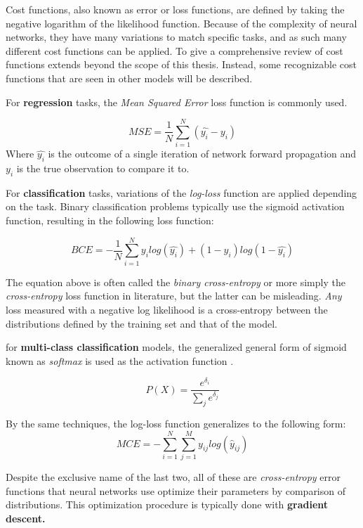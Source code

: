 Cost functions, also known as error or loss functions, are defined by taking the negative logarithm of the likelihood function.\cite{bishop2006pattern}  Because of the complexity of neural networks, they have many variations to match specific tasks, and as such many different cost functions can be applied.  To give a comprehensive review of cost functions extends beyond the scope of this thesis.  Instead, some recognizable cost functions that are seen in other models will be described.

For \textbf{regression} tasks, the \textit{Mean Squared Error} loss function is commonly used.

\[
MSE = \frac{1}{N} \sum_{i=1}^N (\hat{y_i} - y_i)
\] Where $\hat{y_i}$ is the outcome of a single iteration of network forward
propagation and \(y_i\) is the true observation to compare it to.

For \textbf{classification} tasks, variations of the \textit{log-loss} function are applied depending on the task.  Binary classification problems typically use the sigmoid activation function, resulting in the following loss function:


$$
BCE = - \frac{1}{N} \sum_{i=1}^N y_i log (\hat{y_i}) + (1-y_i) log(1-\hat{y_i})
$$

The equation above is often called the \textit{binary cross-entropy} or more simply the \textit{cross-entropy} loss function in literature, but the latter can be misleading.  \textit{Any} loss measured with a negative log likelihood is a cross-entropy between the distributions defined by the training set and that of the model. \cite{Goodfellow-et-al-2016}

for \textbf{multi-class classification} models, the generalized general form of sigmoid known as \textit{softmax} is used as the activation function \cite{bishop2006pattern}.  

$$
P(X) = \frac{e^{\delta_i}}{\sum_j{e^{\delta_j} }}
$$

By the same techniques, the log-loss function generalizes to the following form:
$$
MCE = -\sum_{i=1}^N \sum_{j=1}^M y_{ij} log (\hat{y}_{ij})
$$

Despite the exclusive name of the last two, all of these are \textit{cross-entropy} error functions that neural networks use optimize their parameters by comparison of distributions.  This optimization procedure is typically done with \textbf{gradient descent.}


